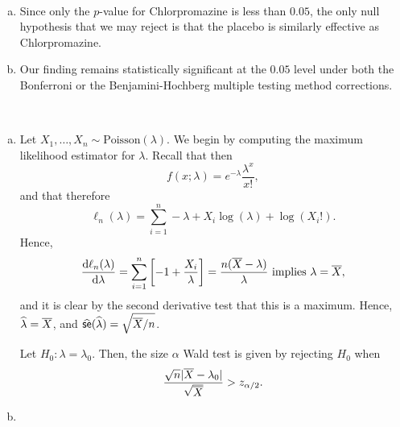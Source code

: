 \begin{ex}~
  \begin{enumerate}[(a)]
    \item
          \inputminted{python}{../code/10-11.py}
          \inputminted{text}{../output/10-11.txt}
          Since only the $p$-value for Chlorpromazine is less than $0.05$, the
          only null hypothesis that we may reject is that the placebo is
          similarly effective as Chlorpromazine.
    \item Our finding remains statistically significant at the $0.05$ level
          under both the Bonferroni or the Benjamini-Hochberg multiple
          testing method corrections.
  \end{enumerate}
\end{ex}

\begin{ex}~
  \begin{enumerate}[(a)]
    \item Let $X_1,\ldots,X_n\sim\text{Poisson}(\lambda)$. We begin by computing
          the maximum likelihood estimator for $\lambda$. Recall that then
          \[
            f(x;\lambda)=e^{-\lambda}\frac{\lambda^x}{x!},
          \]
          and that therefore
          \[
            \ell_n(\lambda)=\sum_{i=1}^n-\lambda+X_i\log(\lambda)+\log(X_i!).
          \]
          Hence,
          \[
            \frac{\mathrm{d}\ell_n(\lambda)}{\mathrm{d}\lambda}
            =\sum_{i=1}^n\left[-1+\frac{X_i}{\lambda}\right]
            =\frac{n(\overline{X}-\lambda)}{\lambda}
            \text{ implies }
            \lambda=\overline{X},
          \]
          and it is clear by the second derivative test that this is a maximum.
          Hence, $\widehat{\lambda}=\overline{X}$, and
          $\widehat{\textsf{se}}(\widehat{\lambda})=\sqrt{\overline{X}/n}$.

          Let $H_0:\lambda=\lambda_0$. Then, the size $\alpha$ Wald test is
          given by rejecting $H_0$ when
          \[
            \frac{\sqrt{n}|\overline{X}-\lambda_0|}{\sqrt{\overline{X}}}>z_{\alpha/2}.
          \]
    \item
          \inputminted{python}{../code/10-12.py}
          \inputminted{text}{../output/10-12.txt}
  \end{enumerate}
\end{ex}

